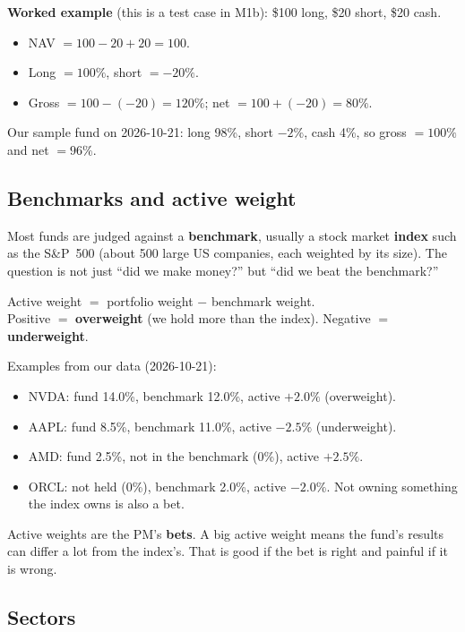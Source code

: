 \documentclass[11pt]{article}
\begin{document}
\textbf{Worked example} (this is a test case in M1b): \$100 long, \$20 short, \$20 cash.
\begin{itemize}
  \item NAV $= 100 - 20 + 20 = 100$.
  \item Long $= 100\%$, short $= -20\%$.
  \item Gross $= 100 - (-20) = 120\%$; net $= 100 + (-20) = 80\%$.
\end{itemize}

Our sample fund on 2026-10-21: long 98\%, short $-2\%$, cash 4\%, so gross $= 100\%$ and
net $= 96\%$.

\subsection{Benchmarks and active weight}

Most funds are judged against a \textbf{benchmark}, usually a stock market
\textbf{index} such as the S\&P~500 (about 500 large US companies, each weighted by its size).
The question is not just ``did we make money?'' but ``did we beat the benchmark?''

\begin{keyidea}
Active weight $=$ portfolio weight $-$ benchmark weight.\\
Positive $=$ \textbf{overweight} (we hold more than the index). Negative $=$
\textbf{underweight}.
\end{keyidea}

Examples from our data (2026-10-21):
\begin{itemize}
  \item NVDA: fund 14.0\%, benchmark 12.0\%, active $+2.0\%$ (overweight).
  \item AAPL: fund 8.5\%, benchmark 11.0\%, active $-2.5\%$ (underweight).
  \item AMD: fund 2.5\%, not in the benchmark (0\%), active $+2.5\%$.
  \item ORCL: not held (0\%), benchmark 2.0\%, active $-2.0\%$. Not owning something the index
        owns is also a bet.
\end{itemize}

Active weights are the PM's \textbf{bets}. A big active weight means the fund's results can
differ a lot from the index's. That is good if the bet is right and painful if it is wrong.

\subsection{Sectors}
\end{document}
